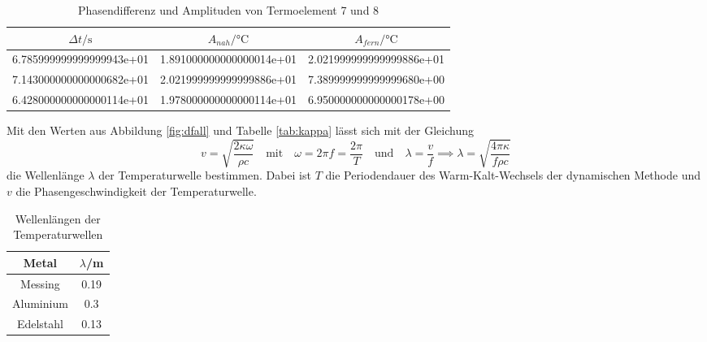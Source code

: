 \begin{table}
  \centering
  \caption{Phasendifferenz und Amplituden von Termoelement 7 und 8}
    \begin{tabular}{S S S}
      \toprule
      $\Delta t / \si{\second}$ & $A_{nah} / \si{\celsius}$ &
      $A_{fern} / \si{\celsius}$ \\
      \midrule
      6.785999999999999943e+01 & 1.891000000000000014e+01 & 2.021999999999999886e+01\\
      7.143000000000000682e+01 & 2.021999999999999886e+01 & 7.389999999999999680e+00\\
      6.428000000000000114e+01 & 1.978000000000000114e+01 & 6.950000000000000178e+00\\
      \bottomrule
    \end{tabular}
    \label{tab:A78}
\end{table}

\FloatBarrier
Mit den Werten aus Abbildung \ref{fig:dfall} und
Tabelle \ref{tab:kappa} lässt sich mit
der Gleichung
\begin{equation*}
  v = \sqrt{\frac{2\kappa \omega}{\rho c }} \quad \text{mit} \quad
  \omega = 2\pi f = \frac{2\pi}{T}
  \quad \text{und} \quad
  \lambda = \frac{v}{f}
  \implies \lambda = \sqrt{\frac{4\pi\kappa}{f \rho c}}
\end{equation*}
die Wellenlänge $ \lambda $ der Temperaturwelle bestimmen. Dabei ist
$T$ die Periodendauer des Warm-Kalt-Wechsels der dynamischen Methode und
$v$ die Phasengeschwindigkeit der Temperaturwelle.
\begin{table}
  \centering
  \caption{Wellenlängen der Temperaturwellen}
  \begin{tabular}{cc}
    \toprule
    Metal & $\lambda$/\si{\meter} \\
    \midrule
    Messing & 0.19 \\
    Aluminium & 0.3 \\
    Edelstahl & 0.13 \\
    \bottomrule
  \end{tabular}
  \label{tab:lam}
\end{table}





























%
